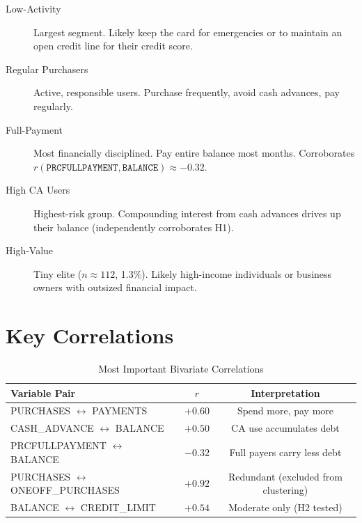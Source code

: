 \documentclass[12pt, letterpaper]{article}
\begin{document}
\begin{description}
  \item[Low-Activity] Largest segment. Likely keep the card for emergencies or
    to maintain an open credit line for their credit score.
  \item[Regular Purchasers] Active, responsible users. Purchase frequently,
    avoid cash advances, pay regularly.
  \item[Full-Payment] Most financially disciplined. Pay entire balance most months.
    Corroborates $r(\texttt{PRCFULLPAYMENT}, \texttt{BALANCE})\approx-0.32$.
  \item[High CA Users] Highest-risk group. Compounding interest from cash advances
    drives up their balance (independently corroborates H1).
  \item[High-Value] Tiny elite ($n\approx112$, 1.3\%). Likely high-income
    individuals or business owners with outsized financial impact.
\end{description}

\section{Key Correlations}

\begin{table}[H]
  \centering
  \caption{Most Important Bivariate Correlations}
  \begin{tabular}{lcc}
    \toprule
    \textbf{Variable Pair} & \textbf{$r$} & \textbf{Interpretation} \\
    \midrule
    PURCHASES $\leftrightarrow$ PAYMENTS          & $+0.60$ & Spend more, pay more \\
    CASH\_ADVANCE $\leftrightarrow$ BALANCE       & $+0.50$ & CA use accumulates debt \\
    PRCFULLPAYMENT $\leftrightarrow$ BALANCE      & $-0.32$ & Full payers carry less debt \\
    PURCHASES $\leftrightarrow$ ONEOFF\_PURCHASES & $+0.92$ & Redundant (excluded from clustering) \\
    BALANCE $\leftrightarrow$ CREDIT\_LIMIT       & $+0.54$ & Moderate only (H2 tested) \\
    \bottomrule
  \end{tabular}
\end{table}

\end{document}
